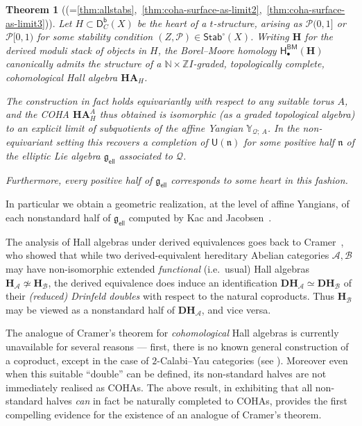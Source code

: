 \documentclass[reqno,a4paper]{amsart}
\newcommand{\calP}{\mathcal{P}}
\newcommand{\N}{\mathbb{N}}
\newcommand{\Y}{\mathbb{Y}}
\newcommand{\Z}{\mathbb{Z}}
\newcommand{\scrA}{\mathscr{A}}
\newcommand{\scrB}{\mathscr{B}}
\newcommand{\sfU}{\mathsf{U}}
\newcommand{\frakn}{\mathfrak{n}}
\newcommand{\bfH}{\mathbf{H}}
\newcommand{\Stab}{\mathsf{Stab}}
\newcommand{\catDb}{\mathsf{D}^\mathsf{b}}
\newcommand{\qv}{\mathcal{Q}}
\newcommand{\rsv}{X}
\newcommand{\frakgell}{\mathfrak{g}_{\mathsf{ell}}}
\newcommand{\HBMbullet}{\mathsf{H}_\bullet^{\mathsf{BM}}}
\newcommand{\coha}{\mathbf{HA}}
\theoremstyle{basic-theorem}
\numberwithin{equation}{section}
\newtheorem{theoremintroduction}{Theorem}
\begin{document}
\begin{theoremintroduction}[{(=\ref{thm:allstabs},~\ref{thm:coha-surface-as-limit2},~\ref{thm:coha-surface-as-limit3})}] \label{thm:genericfirst}
    Let $H\subset \catDb_C(\rsv)$ be the heart of a $t$-structure, arising as
    $\calP(0,1]$ or $\calP[0,1)$ for some stability condition $(Z,\calP)\in
    \Stab^\circ(\rsv)$. Writing $\bfH$ for the derived moduli stack of objects
    in $H$, the Borel--Moore homology $\HBMbullet(\bfH)$ canonically admits the
    structure of a $\N\times \Z I$-graded, topologically complete, cohomological
    Hall algebra $\coha_H$. 

    The construction in fact holds equivariantly with respect to any suitable
    torus $A$, and the COHA $\coha_H^A$ thus obtained is isomorphic (as a graded
    topological algebra) to an explicit limit of subquotients of the
    affine Yangian $\Y_{\qv;\ A}$. In the non-equivariant setting this recovers
    a completion of $\sfU(\frakn)$ for some positive half $\frakn$ of the
    elliptic Lie algebra $\frakgell$ associated to $\qv$. 

    Furthermore, every positive half of $\frakgell$ corresponds to some heart in
    this fashion.
\end{theoremintroduction}
In particular we obtain a geometric realization, at the level of affine Yangians, of each nonstandard half of $\frakgell$ computed by Kac and Jacobsen~\cite{Jakobsen-Kac-Borel, Jakobsen-Kac-Borel-II}. 

\medskip

The analysis of Hall algebras under derived equivalences goes back to Cramer~\cite{Cramer_Hall}, who showed that while two derived-equivalent hereditary Abelian categories $\scrA,\scrB$ may have non-isomorphic extended \textit{functional} (i.e.\ usual) Hall algebras $\bfH_\scrA\not\simeq\bfH_\scrB$, the derived equivalence does induce an identification $\mathbf{DH}_\scrA \simeq \mathbf{DH}_\scrB$ of their \textit{(reduced) Drinfeld doubles} with respect to the natural coproducts. Thus $\bfH_\scrB$ may be viewed as a nonstandard half of $\mathbf{DH}_\scrA$, and vice versa.

The analogue of Cramer's theorem for \textit{cohomological} Hall algebras is currently unavailable for several reasons --- first, there is no known general construction of a coproduct, except in the case of $2$-Calabi--Yau categories (see \cite{DHKSV}). Moreover even when this suitable ``double'' can be defined, its non-standard halves are not immediately realised as COHAs. The above result, in exhibiting that all non-standard halves \textit{can} in fact be naturally completed to COHAs, provides the first compelling evidence for the existence of an analogue of Cramer's theorem.
\end{document}
